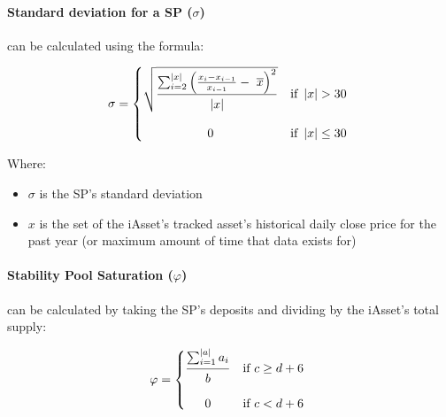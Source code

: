 \documentclass{article}
\begin{document}
\begin{sloppypar}
\hypertarget{standard-deviation-for-a-sp-sigma}{%
\paragraph{\texorpdfstring{Standard deviation for a SP
(\(\sigma\))}{Standard deviation for a SP (\textbackslash sigma)}}\label{standard-deviation-for-a-sp-sigma}}

can be calculated using the formula:

\[\sigma = \left\{ \begin{matrix}
  \sqrt{\genfrac{}{}{}{}{\raisebox{5pt}{$\sum_{i = 2}^{\left| x \right|}\left( \frac{x_{i} - x_{i - 1}}{x_{i - 1}} - \ \overline{x} \right)^{2}$}}{\raisebox{-5pt}{$\left| x \right|$}}} & \text{if\ }\left| x \right| > 30 \\ \\
  0 & \text{if\ }\left| x \right| \leq 30 \\
  \end{matrix} \right.\ \]

Where:

\begin{itemize}
\item
  \(\sigma\) is the SP's standard deviation
\item
  \(x\) is the set of the iAsset's tracked asset's historical daily
  close price for the past year (or maximum amount of time that data
  exists for)
\end{itemize}

\filbreak

\hypertarget{stability-pool-saturation-varphi}{%
\paragraph{\texorpdfstring{Stability Pool Saturation
(\(\varphi\))}{Stability Pool Saturation (\textbackslash varphi)}}\label{stability-pool-saturation-varphi}}

can be calculated by taking the SP's deposits and dividing by the
iAsset's total supply:

\[\varphi = \left\{ \begin{matrix}
  \genfrac{}{}{}{}{\raisebox{5pt}{$\sum_{i = 1}^{\left| a \right|}a_{i}$}}{\raisebox{-5pt}{$b$}} & \text{if\ }c \geq d + 6 \\ \\
  0 & \text{if\ }c < d + 6 \\
  \end{matrix} \right.\ \]


\end{sloppypar}
\end{document}
